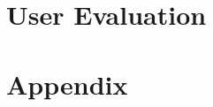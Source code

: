 \documentclass[unicode,9pt,a4paper,oneside,numbers=endperiod,openany]{scrartcl}
\begin{document}
\section{User Evaluation}

\section{Appendix}
\end{document}
